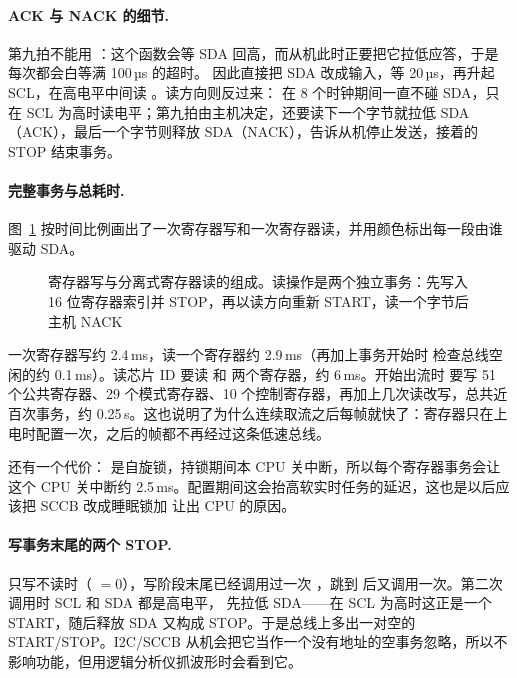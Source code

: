 \paragraph{ACK 与 NACK 的细节.} 第九拍不能用 ：这个函数会等 SDA 回高，而从机此时正要把它拉低应答，于是每次都会白等满 100\,µs 的超时。 因此直接把 SDA 改成输入，等 20\,µs，再升起 SCL，在高电平中间读 。读方向则反过来： 在 8 个时钟期间一直不碰 SDA，只在 SCL 为高时读电平；第九拍由主机决定，还要读下一个字节就拉低 SDA（ACK），最后一个字节则释放 SDA（NACK），告诉从机停止发送，接着的 STOP 结束事务。

\paragraph{完整事务与总耗时.} 图~\ref{fig:sccb-trans} 按时间比例画出了一次寄存器写和一次寄存器读，并用颜色标出每一段由谁驱动 SDA。

\begin{figure}[htbp]
  \centering
  
  \caption{寄存器写与分离式寄存器读的组成。读操作是两个独立事务：先写入 16 位寄存器索引并 STOP，再以读方向重新 START，读一个字节后主机 NACK}
  \label{fig:sccb-trans}
\end{figure}

一次寄存器写约 2.4\,ms，读一个寄存器约 2.9\,ms（再加上事务开始时  检查总线空闲的约 0.1\,ms）。读芯片 ID 要读  和  两个寄存器，约 6\,ms。开始出流时  要写 51 个公共寄存器、29 个模式寄存器、10 个控制寄存器，再加上几次读改写，总共近百次事务，约 0.25\,s。这也说明了为什么连续取流之后每帧就快了：寄存器只在上电时配置一次，之后的帧都不再经过这条低速总线。

还有一个代价： 是自旋锁，持锁期间本 CPU 关中断，所以每个寄存器事务会让这个 CPU 关中断约 2.5\,ms。配置期间这会抬高软实时任务的延迟，这也是以后应该把 SCCB 改成睡眠锁加  让出 CPU 的原因。

\paragraph{写事务末尾的两个 STOP.} 只写不读时（ $=0$），写阶段末尾已经调用过一次 ，跳到  后又调用一次。第二次调用时 SCL 和 SDA 都是高电平， 先拉低 SDA——在 SCL 为高时这正是一个 START，随后释放 SDA 又构成 STOP。于是总线上多出一对空的 START/STOP。I2C/SCCB 从机会把它当作一个没有地址的空事务忽略，所以不影响功能，但用逻辑分析仪抓波形时会看到它。

